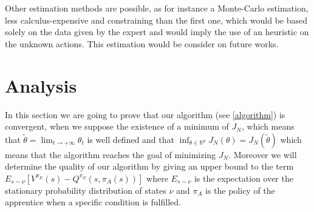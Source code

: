 \documentclass{article}
\begin{document}
Other estimation methods are possible, as for instance a Monte-Carlo estimation, less calculus-expensive and constraining than the first one, which would be based solely on the data given by the expert and would imply the use of an heuristic on the unknown actions. This estimation would be consider on future works.
\section{Analysis}\label{proof.sec}
In this section we are going to prove that our algorithm (see \eqref{algorithm}) is convergent, when we suppose the existence of a minimum of $J_N$,  which means that $\tilde{\theta}=\lim_{t\rightarrow+\infty}\theta_t$
is well defined and that $\inf_{\theta\in\mathbb{R}^p}J_N(\theta)=J_N(\tilde{\theta})$ which means that the algorithm reaches the goal of minimizing $J_N$.
Moreover we will determine the quality of our algorithm by giving an upper bound to the term $E_{s\sim\nu}[V^{\pi_E}(s)-Q^{\pi_E}(s,\pi_A(s))]$ where $E_{s\sim\nu}$ is the expectation
over the stationary probability distribution of states $\nu$ and $\pi_A$ is the policy of the apprentice when a specific condition is fulfilled.
\end{document}

